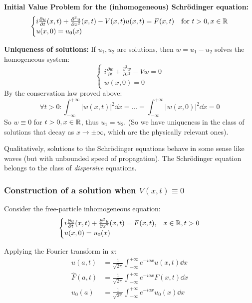 \textbf{Initial Value Problem for the (inhomogeneous) Schrödinger equation:}
\begin{equation}
\begin{cases}
    i\frac{\partial u}{\partial t}(x,t) + \frac{\partial^2 u}{\partial x^2}(x,t) - V(x,t)u(x,t) = F(x,t) & \text{for } t>0, x \in \mathbb{R} \\
    u(x,0) = u_0(x)
\end{cases}
\end{equation}

\textbf{Uniqueness of solutions:}
If $u_1, u_2$ are solutions, then $w = u_1 - u_2$ solves the homogeneous system:
$$ \begin{cases}
    i\frac{\partial w}{\partial t} + \frac{\partial^2 w}{\partial x^2} - V w = 0 \\
    w(x,0) = 0
\end{cases} $$
By the conservation law proved above:
$$ \forall t > 0 : \int_{-\infty}^{+\infty} |w(x,t)|^2 \dd x = \dots = \int_{-\infty}^{+\infty} |w(x,0)|^2 \dd x = 0 $$
So $w \equiv 0$ for $t > 0, x \in \mathbb{R}$, thus $u_1 = u_2$. (So we have uniqueness in the class of solutions that decay as $x \rightarrow \pm\infty$, which are the physically relevant ones).

\begin{remark}
Qualitatively, solutions to the Schrödinger equations behave in some sense like waves (but with unbounded speed of propagation). The Schrödinger equation belongs to the class of \textit{dispersive} equations.
\end{remark}

\subsubsection{Construction of a solution when $V(x,t) \equiv 0$}

Consider the free-particle inhomogeneous equation:
$$ \begin{cases}
    i\frac{\partial u}{\partial t}(x,t) + \frac{\partial^2 u}{\partial x^2}(x,t) = F(x,t), & x \in \mathbb{R}, t>0 \\
    u(x,0) = u_0(x)
\end{cases} $$

Applying the Fourier transform in $x$:
\begin{align*}
    \hat{u}(a,t) &= \frac{1}{\sqrt{2\pi}} \int_{-\infty}^{+\infty} e^{-iax} u(x,t) \dd x \\
    \hat{F}(a,t) &= \frac{1}{\sqrt{2\pi}} \int_{-\infty}^{+\infty} e^{-iax} F(x,t) \dd x \\
    \hat{u}_0(a) &= \frac{1}{\sqrt{2\pi}} \int_{-\infty}^{+\infty} e^{-iax} u_0(x) \dd x
\end{align*}

